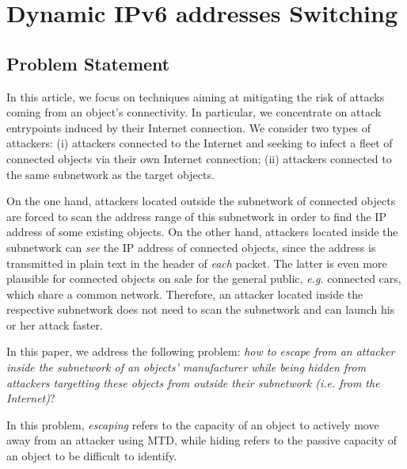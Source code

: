 
\chapter{Dynamic IPv6 addresses Switching} \label{MTDIP}
\smallskip
\hfill
\begin{minipage}[b]{8cm}
\end{minipage}
\vskip 2cm

\section{Problem Statement}
\label{sec:ps}


{\Huge I}n this article, we focus on techniques aiming at mitigating the risk
of attacks coming from an object's connectivity. In particular, we
concentrate on attack entrypoints induced by their Internet
connection. We consider two types of attackers: (i) attackers
connected to the Internet and seeking to infect a fleet of connected
objects via their own Internet connection; (ii) attackers connected to
the same subnetwork as the target objects.

On the one hand, attackers located outside the subnetwork of connected objects
are forced to scan the address range of this subnetwork in order to find the IP
address of some existing objects. On the other hand, attackers located inside
the subnetwork can \emph{see} the IP address of connected objects, since the
address is transmitted in plain text in the header of \emph{each} packet. The
latter is even more plausible for connected objects on sale for the general
public, \emph{e.g.} connected cars, which share a common network. Therefore, an
attacker located inside the respective subnetwork does not need to scan the
subnetwork and can launch his or her attack faster.

In this paper, we address the following problem: \emph{how to escape
from an attacker inside the subnetwork of an objects' manufacturer while
being hidden from attackers targetting these objects from outside
their subnetwork (i.e. from the Internet)}?

In this problem, \emph{escaping} refers to the capacity of an object to actively move
away from an attacker using MTD, while hiding refers to the passive capacity
of an object to be difficult to identify.

